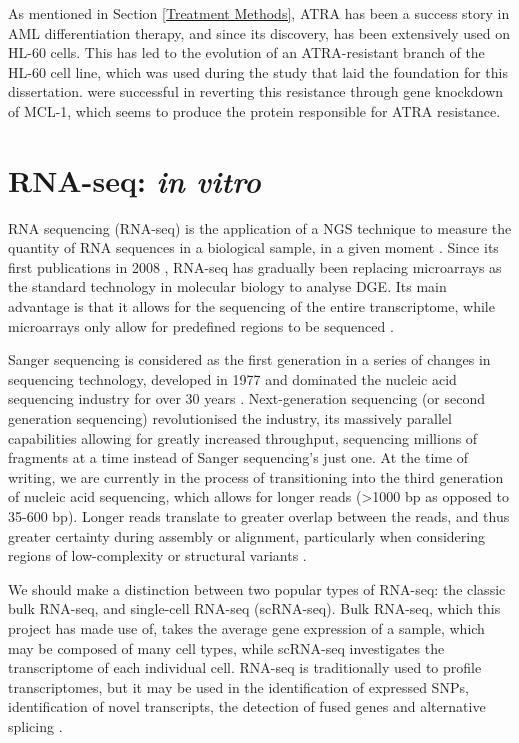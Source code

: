 As mentioned in Section \ref{Treatment Methods}, \ac{ATRA} has been a success story in \ac{AML} differentiation therapy, and since its discovery, has been extensively used on HL-60 cells. This has led to the evolution of an ATRA-resistant branch of the HL-60 cell line, which was used during the study \citep{Gatt2016} that laid the foundation for this dissertation. \cite{fu2005effects} were successful in reverting this resistance through gene knockdown of MCL-1, which seems to produce the protein responsible for \ac{ATRA} resistance.


\section{RNA-seq: \textit{in vitro}}
RNA sequencing (RNA-seq) is the application of a \ac{NGS} technique to measure the quantity of RNA sequences in a biological sample, in a given moment \citep{zhong2009}. Since its first publications in 2008 \citep{nagalakshmi2008transcriptional, lister2008highly, cloonan2008stem}, RNA-seq has gradually been replacing microarrays as the standard technology in molecular biology to analyse \ac{DGE}. Its main advantage is that it allows for the sequencing of the entire transcriptome, while microarrays only allow for predefined regions to be sequenced \citep{rao2019comparison}. 

Sanger sequencing is considered as the first generation in a series of changes in sequencing technology, developed in 1977 and dominated the nucleic acid sequencing industry for over 30 years \citep{behjati2013next}. Next-generation sequencing (or second generation sequencing) revolutionised the industry, its massively parallel capabilities allowing for greatly increased throughput, sequencing millions of fragments at a time instead of Sanger sequencing's just one. At the time of writing, we are currently in the process of transitioning into the third generation of nucleic acid sequencing, which allows for longer reads (>1000 bp as opposed to 35-600 bp). Longer reads translate to greater overlap between the reads, and thus greater certainty during assembly or alignment, particularly when considering regions of low-complexity or structural variants \citep{rhoads2015pacbio}. 

We should make a distinction between two popular types of RNA-seq: the classic bulk RNA-seq, and single-cell RNA-seq (scRNA-seq). Bulk RNA-seq, which this project has made use of, takes the average gene expression of a sample, which may be composed of many cell types, while scRNA-seq investigates the transcriptome of each individual cell. RNA-seq is traditionally used to profile transcriptomes, but it may be used in the identification of expressed SNPs, identification of novel transcripts, the detection of fused genes and alternative splicing \citep{han2015alternative, zhao2014comparison}. 

